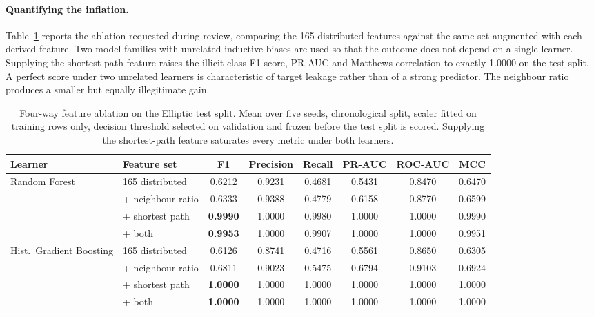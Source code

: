\documentclass[12pt,a4paper]{article}
\begin{document}
\paragraph{Quantifying the inflation.}
Table~\ref{tab:leakage_ablation} reports the ablation requested
during review, comparing the 165 distributed features against the
same set augmented with each derived feature. Two model families
with unrelated inductive biases are used so that the outcome does
not depend on a single learner. Supplying the shortest-path
feature raises the illicit-class F1-score, PR-AUC and Matthews
correlation to exactly 1.0000 on the test split. A perfect score
under two unrelated learners is characteristic of target leakage
rather than of a strong predictor. The neighbour ratio produces a
smaller but equally illegitimate gain.

\begin{table}[htbp]
\centering
\small
\caption{Four-way feature ablation on the Elliptic test split.
Mean over five seeds, chronological split, scaler fitted on
training rows only, decision threshold selected on validation and
frozen before the test split is scored. Supplying the
shortest-path feature saturates every metric under both learners.}
\label{tab:leakage_ablation}
\begin{tabular}{llcccccc}
\toprule
Learner & Feature set & F1 & Precision & Recall & PR-AUC & ROC-AUC & MCC \\
\midrule
\multirow{4}{*}{Random Forest}
 & 165 distributed          & 0.6212 & 0.9231 & 0.4681 & 0.5431 & 0.8470 & 0.6470 \\
 & \quad + neighbour ratio  & 0.6333 & 0.9388 & 0.4779 & 0.6158 & 0.8770 & 0.6599 \\
 & \quad + shortest path    & \textbf{0.9990} & 1.0000 & 0.9980 & 1.0000 & 1.0000 & 0.9990 \\
 & \quad + both             & \textbf{0.9953} & 1.0000 & 0.9907 & 1.0000 & 1.0000 & 0.9951 \\
\midrule
\multirow{4}{*}{Hist.\ Gradient Boosting}
 & 165 distributed          & 0.6126 & 0.8741 & 0.4716 & 0.5561 & 0.8650 & 0.6305 \\
 & \quad + neighbour ratio  & 0.6811 & 0.9023 & 0.5475 & 0.6794 & 0.9103 & 0.6924 \\
 & \quad + shortest path    & \textbf{1.0000} & 1.0000 & 1.0000 & 1.0000 & 1.0000 & 1.0000 \\
 & \quad + both             & \textbf{1.0000} & 1.0000 & 1.0000 & 1.0000 & 1.0000 & 1.0000 \\
\bottomrule
\end{tabular}
\end{table}
\end{document}
